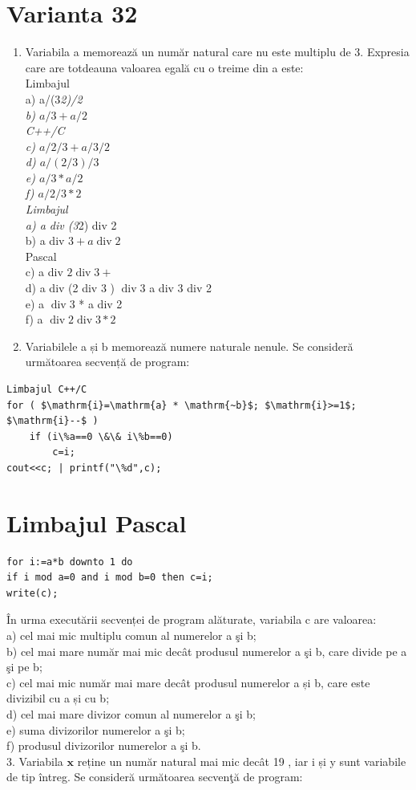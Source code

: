 \documentclass[10pt]{article}
\begin{document}
\section*{Varianta 32}
\begin{enumerate}
  \item Variabila a memorează un număr natural care nu este multiplu de 3. Expresia care are totdeauna valoarea egală cu o treime din a este:\\
Limbajul\\
a) a/(3\textit{2)/2\\
b) $a / 3+a / 2$\\
C++/C\\
c) $a / 2 / 3+a / 3 / 2$\\
d) $a /(2 / 3) / 3$\\
e) $a / 3 * a / 2$\\
f) $a / 2 / 3 * 2$\\
Limbajul\\
a) a div (3}2) div 2\\
b) a div $3+a \operatorname{div} 2$\\
Pascal\\
c) a div $2 \operatorname{div} 3+$\\
d) a div (2 div 3 ) $\operatorname{div} 3$ a div 3 div 2\\
e) a $\operatorname{div} 3$ * a div 2\\
f) a $\operatorname{div} 2 \operatorname{div} 3 * 2$
  \item Variabilele a și b memorează numere naturale nenule. Se consideră următoarea secvență de program:
\end{enumerate}

\begin{verbatim}
Limbajul C++/C
for ( $\mathrm{i}=\mathrm{a} * \mathrm{~b}$; $\mathrm{i}>=1$; $\mathrm{i}--$ )
    if (i\%a==0 \&\& i\%b==0)
        c=i;
cout<<c; | printf("\%d",c);
\end{verbatim}

\section*{Limbajul Pascal}
\begin{verbatim}
for i:=a*b downto 1 do
if i mod a=0 and i mod b=0 then c=i;
write(c);
\end{verbatim}

În urma executării secvenței de program alăturate, variabila c are valoarea:\\
a) cel mai mic multiplu comun al numerelor a şi b;\\
b) cel mai mare număr mai mic decât produsul numerelor a şi b, care divide pe a şi pe b;\\
c) cel mai mic număr mai mare decât produsul numerelor a și b, care este divizibil cu a și cu b;\\
d) cel mai mare divizor comun al numerelor a şi b;\\
e) suma divizorilor numerelor a şi b;\\
f) produsul divizorilor numerelor a şi b.\\
3. Variabila $\mathbf{x}$ reține un număr natural mai mic decât 19 , iar i și y sunt variabile de tip întreg. Se consideră următoarea secvenţă de program:
\end{document}
